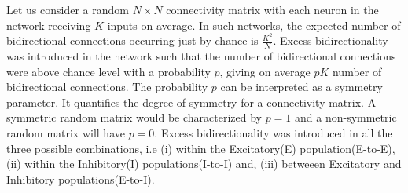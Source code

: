 
Let us consider a random $N \times N$ connectivity matrix with each neuron in the network receiving $K$ inputs on average. In such networks, the expected number of bidirectional connections occurring just by chance is $\frac{K^2}{N}$. Excess bidirectionality was introduced in the network such that the number of bidirectional connections were above chance level with a probability $p$, giving on average $pK$ number of bidirectional connections. The probability $p$ can be interpreted as a symmetry parameter. It quantifies the degree of symmetry for a connectivity matrix. A symmetric random matrix would be characterized by $p = 1$ and a non-symmetric random matrix will have $p = 0$. %
Excess bidirectionality was introduced in all the three possible combinations, i.e (i) within the Excitatory(E) population(E-to-E), (ii) within the Inhibitory(I) populations(I-to-I) and, (iii) betweeen Excitatory and Inhibitory populations(E-to-I). \\


